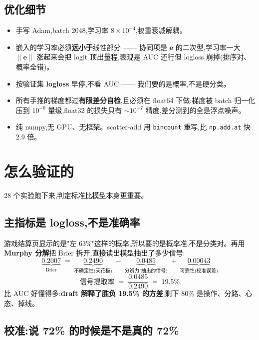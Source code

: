 \documentclass[11pt,a4paper]{article}
\begin{document}
\subsection{优化细节}
\begin{itemize}
\item 手写 Adam,batch 2048,学习率 $8\times10^{-4}$,权重衰减解耦。
\item 嵌入的学习率必须\textbf{远小于}线性部分 —— 协同项是 $\mathbf{e}$ 的二次型,学习率一大 $\|\mathbf{e}\|$ 涨起来会把 logit 顶出量程,表现是 AUC 还行但 logloss 崩掉(排序对、概率全错)。
\item 按验证集 \textbf{logloss} 早停,不看 AUC —— 我们要的是概率,不是硬分类。
\item 所有手推的梯度都过\textbf{有限差分自检},且必须在 float64 下做:梯度被 batch 归一化压到 $10^{-6}$ 量级,float32 的损失只有 $\sim10^{-7}$ 精度,差分测到的全是浮点噪声。
\item 纯 numpy,无 GPU、无框架。scatter-add 用 \texttt{bincount} 重写,比 \texttt{np.add.at} 快 2.9 倍。
\end{itemize}

\section{怎么验证的}

28 个实验跑下来,判定标准比模型本身更重要。

\subsection{主指标是 logloss,不是准确率}

游戏结算页显示的是"左 63\%"这样的概率,所以要的是概率准,不是分类对。再用 \textbf{Murphy 分解}把 Brier 拆开,直接读出模型抽出了多少信号:
\[
\underbrace{0.2007}_{\text{Brier}}\;=\;\underbrace{0.2490}_{\text{不确定性(天花板)}}\;-\;\underbrace{0.0485}_{\text{分辨力(抽出的信号)}}\;+\;\underbrace{0.00043}_{\text{可靠性(校准误差)}}
\]
\[
\text{信号提取率} \;=\; \frac{0.0485}{0.2490} \;=\; \mathbf{19.5\%}
\]
比 AUC 好懂得多:\textbf{draft 解释了胜负 19.5\% 的方差},剩下 80\% 是操作、分路、心态、掉线。

\subsection{校准:说 72\% 的时候是不是真的 72\%}
\end{document}
